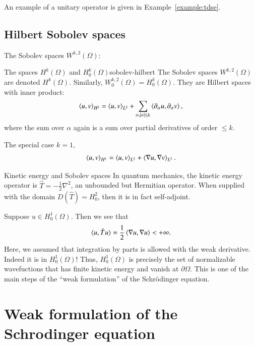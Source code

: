 An example of a unitary operator is given in Example~\ref{example:tdse}.


\subsection{Hilbert Sobolev spaces}

The Sobolev spaces $W^{k,2}(\Omega)$:
\begin{myDefinition}{The spaces $H^k(\Omega)$ and $H^k_0(\Omega)$}{sobolev-hilbert}
The Sobolev spaces $W^{k,2}(\Omega)$ are denoted $H^k(\Omega)$. Similarly, $W^{k,2}_0(\Omega) = H^k_0(\Omega)$. They are Hilbert spaces with inner product:
\begin{equation}
    \braket{u,v}_{H^k} = \braket{u,v}_{L^2} + \sum_{\alpha, |\alpha|\leq k} \braket{\partial_\alpha u, \partial_\alpha v},
\end{equation}
where the sum over $\alpha$ again is a sum over partial derivatives of order $\leq k$.

The special case $k=1$,
\begin{equation}
    \braket{u,v}_{H^1} = \braket{u,v}_{L^2} +  \braket{\nabla u, \nabla v}_{L^2}.
\end{equation}
\end{myDefinition}

\begin{myRemark}{Kinetic energy and Sobolev spaces}{}
In quantum mechanics, the kinetic energy operator is $\hat{T} = -\frac{1}{2}\nabla^2$, an unbounded but Hermitian operator. When supplied with the domain $D(\hat{T}) = H^2_0$, then it is in fact self-adjoint.

Suppose $u \in H^1_0(\Omega)$. Then we see that
\begin{equation}
    \braket{u,\hat{T} u} = \frac{1}{2} \braket{\nabla u, \nabla u} < +\infty.
\end{equation}
Here, we assumed that integration by parts is allowed with the weak derivative. Indeed it is in $H^1_0(\Omega)$! Thus, $H^1_0(\Omega)$ is precisely the set of normalizable wavefuctions that has finite kinetic energy and vanish at $\partial \Omega$. This is one of the main steps of the ``weak formulation'' of the Schrödinger equation.
\end{myRemark}


\section{Weak formulation of the Schrodinger equation}
\label{sec:weak formulation of schroedinger}


